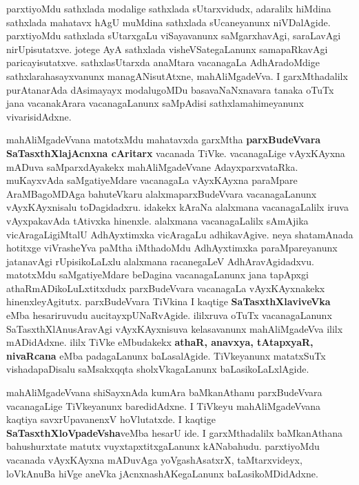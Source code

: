 parxtiyoMdu sathxlada modalige sathxlada sUtarxvidudx, adaralilx hiMdina sathxlada mahatavx hAgU muMdina sathxlada sUcane\-yanunx niVDalAgide. parxtiyoMdu sathxlada sUtarxgaLu viSayavanunx saMgarxhavAgi, saraLavAgi nirUpisutatxve. jotege AyA sathxlada visheVSate\-gaLanunx samapaRkavAgi paricayisutatxve. sathxlasUtarxda anaMtara vacanagaLa AdhAradoMdige sathxlarahasayxvanunx managANisutAtxne, mahAliMgadeVva. I garxMthadalilx purAtanarAda dAsimayayx modalugoMDu basavaNaNxnavara tanaka oTuTx  jana vacanakArara  vacanagaLanunx saMpAdisi sathxlamahimeyanunx vivarisidAdxne.

mahAliMgadeVvana matotxMdu mahatavxda garxMtha \textbf{parxBudeVvara SaTasxthXlajAcnxna cAritarx} vacanada TiVke. vacanagaLige vAyxKAyxna mADuva saMparxdAyakekx mahAliMgadeVvane AdayxparxvataRka. muKayxvAda saMgatiyeMdare vacanagaLa vAyxKAyxna paraMpare AraMBagoMDAga bahuteVkaru alalxmaparxBudeVvara vacanagaLanunx vAyxKAyxnisalu toDagidadxru. idakekx kAraNa alalxmana vacanagaLalilx iruva vAyxpakavAda tAtivxka hinenxle. alalxmana vacanagaLalilx sAmAjika vicAragaLigiMtalU AdhAyxtimxka vicAragaLu adhikavAgive. neya shatamAnada hotitxge viVrasheYva paMtha iMthadoMdu AdhAyxtimxka paraMpareyanunx jatanavAgi rUpisikoLaLxlu alalxmana racanegaLeV AdhAravAgidadxvu. matotxMdu saMgatiyeMdare beDagina vacanagaLanunx jana tapApxgi athaRmADikoLuLxtitxdudx  parxBudeVvara vacanagaLa vAyxKAyxnakekx hinenxleyAgitutx. parxBudeVvara TiVkina I kaqtige \textbf{SaTasxthXlaviveVka} eMba hesariruvudu aucitayxpUNaRvAgide. ililxruva oTuTx  vacanagaLanunx SaTasxthXlAnusAravAgi vAyxKAyxnisuva kelasavanunx mahAliMgadeVva ililx mADidAdxne. ililx TiVke eMbudakekx \textbf{athaR, anavxya, tAtapxyaR, nivaRcana} eMba padagaLanunx baLasalAgide. TiVkeyanunx matatxSuTx vishadapaDisalu saMsakxqqta sholxVkagaLanunx baLasi\-koLaLxlAgide.

\vskip 2pt

mahAliMgadeVvana shiSayxnAda kumAra baMkanAthanu parxBudeVvara vacanagaLige TiVkeyanunx baredidAdxne. I TiVkeyu mahAliMga\-deVvana kaqtiya savxrUpavanenxV hoVlutatxde. I kaqtige \textbf{SaTasxthXloVpadeVsha}veMba hesarU ide. I garxMthadalilx baMkanAthana bahushurxtate matutx vuyxtapxtitxgaLanunx kANabahudu. parxtiyoMdu vacanada vAyxKAyxna mADuvAga yoVgashAsatxrX, taMtarxvideyx, loVkAnuBa hiVge aneVka jAcnxnashAKegaLanunx baLasikoMDidAdxne.

\vskip 2pt


